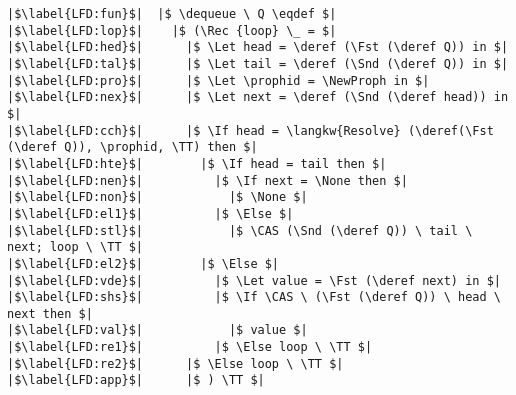 \documentclass[a4paper, 11pt]{report}
\newcommand{\initialise}{\operatorname{initialize}}
\newcommand{\dequeue}{\operatorname{dequeue}}
\begin{document}
\begin{verbatim}
|$\label{LFD:fun}$|  |$ \dequeue \ Q \eqdef $|
|$\label{LFD:lop}$|    |$ (\Rec {loop} \_ = $|
|$\label{LFD:hed}$|      |$ \Let head = \deref (\Fst (\deref Q)) in $|
|$\label{LFD:tal}$|      |$ \Let tail = \deref (\Snd (\deref Q)) in $|
|$\label{LFD:pro}$|      |$ \Let \prophid = \NewProph in $|
|$\label{LFD:nex}$|      |$ \Let next = \deref (\Snd (\deref head)) in $|
|$\label{LFD:cch}$|      |$ \If head = \langkw{Resolve} (\deref(\Fst (\deref Q)), \prophid, \TT) then $|
|$\label{LFD:hte}$|        |$ \If head = tail then $|
|$\label{LFD:nen}$|          |$ \If next = \None then $|
|$\label{LFD:non}$|            |$ \None $|
|$\label{LFD:el1}$|          |$ \Else $|
|$\label{LFD:stl}$|            |$ \CAS (\Snd (\deref Q)) \ tail \ next; loop \ \TT $|
|$\label{LFD:el2}$|        |$ \Else $|
|$\label{LFD:vde}$|          |$ \Let value = \Fst (\deref next) in $|
|$\label{LFD:shs}$|          |$ \If \CAS \ (\Fst (\deref Q)) \ head \ next then $|
|$\label{LFD:val}$|            |$ value $|
|$\label{LFD:re1}$|          |$ \Else loop \ \TT $|
|$\label{LFD:re2}$|      |$ \Else loop \ \TT $|
|$\label{LFD:app}$|      |$ ) \TT $|
\end{verbatim}

\end{document}

